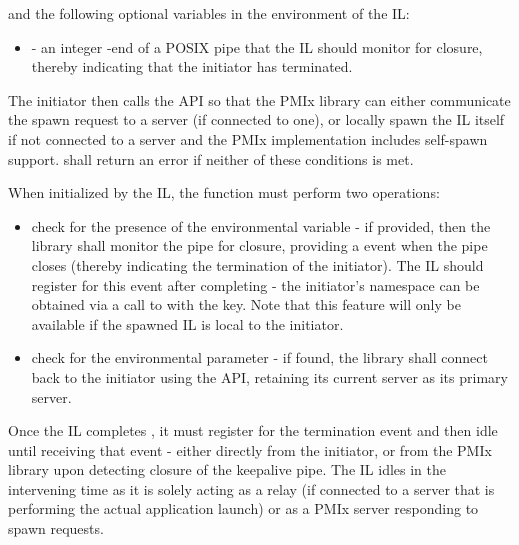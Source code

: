 and the following optional variables in the environment of the \ac{IL}:

\begin{itemize}
    \item {} - an integer -end of a POSIX pipe that the \ac{IL} should monitor for closure, thereby indicating that the initiator has terminated.
\end{itemize}

The initiator then calls the  \ac{API} so that the \ac{PMIx} library can either communicate the spawn request to a server (if connected to one), or locally spawn the \ac{IL} itself if not connected to a server and the \ac{PMIx} implementation includes self-spawn support.  shall return an error if neither of these conditions is met.

When initialized by the \ac{IL}, the  function must perform two operations:

\begin{itemize}
    \item check for the presence of the  environmental variable - if provided, then the library shall monitor the pipe for closure, providing a  event when the pipe closes (thereby indicating the termination of the initiator). The \ac{IL} should register for this event after completing  - the initiator's namespace can be obtained via a call to  with the  key. Note that this feature will only be available if the spawned \ac{IL} is local to the initiator.
    \item check for the  environmental parameter - if found, the library shall connect back to the initiator using the  \ac{API}, retaining its current server as its primary server.
\end{itemize}

Once the \ac{IL} completes , it must register for the  termination event and then idle until receiving that event - either directly from the initiator, or from the \ac{PMIx} library upon detecting closure of the keepalive pipe. The \ac{IL} idles in the intervening time as it is solely acting as a relay (if connected to a server that is performing the actual application launch) or as a \ac{PMIx} server responding to spawn requests.

